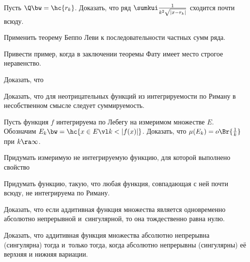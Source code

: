\documentclass[a4paper,draft]{article}
\begin{document}
\begin{problem}
  Пусть $\Q \bw= \hc{r_k}$. Доказать, что ряд $\sumkui \frac{1}{k^2\sqrt{|x-r_k|}}$ сходится почти всюду.
\end{problem}
\begin{solution}
  Применить теорему Беппо Леви к последовательности частных сумм ряда.
\end{solution}

\begin{problem}
  Привести пример, когда в заключении теоремы Фату имеет место строгое неравенство.
\end{problem}

\begin{problem}
  Доказать, что
\end{problem}

\begin{problem}
  Доказать, что для неотрицательных функций  из интегрируемости по Риману в несобственном смысле
  следует суммируемость.
\end{problem}

\begin{problem}
  Пусть функция $f$ интегрируема по Лебегу на измеримом множестве $E$. Обозначим $E_k\bw=\hc{x\in E\vl k<|f(x)|}$.
  Доказать, что $\mu(E_k)=o\Br{\frac1k}$ при $k\ra\infty$.
\end{problem}

\begin{problem}
  Придумать измеримую не интегрируемую функцию, для которой выполнено свойство
\end{problem}

\begin{problem}
  Придумать функцию, такую, что любая функция, совпадающая с ней почти всюду,
  не интегрируема по Риману.
\end{problem}

\begin{problem}
  Доказать, что если аддитивная функция множества является одновременно абсолютно не\-прерывной
  и~сингулярной, то она тождественно равна нулю.
\end{problem}

\begin{problem}
 Доказать, что аддитивная функция множества абсолютно непрерывна (сингулярна) тогда и~только
 тогда, когда абсолютно непрерывны (сингулярны) её верхняя и нижняя вариации.
\end{problem}
\end{document}
